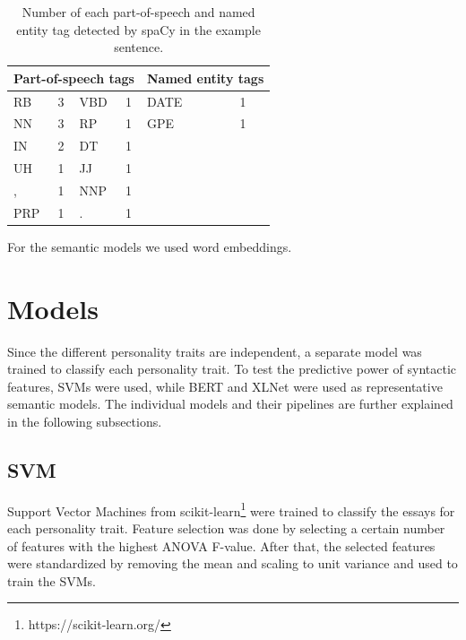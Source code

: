 \documentclass[10pt, a4paper]{article}
\begin{document}
\begin{table}[H]
	\centering
	\begin{tabular}{llllll}
		\hline
		\multicolumn{4}{l}{Part-of-speech tags} & \multicolumn{2}{l}{Named entity tags} \\ \hline
		RB        & 3       & VBD      & 1      & DATE                & 1               \\
		NN        & 3       & RP       & 1      & GPE                 & 1               \\ \cline{5-6} 
		IN        & 2       & DT       & 1      &                     &                 \\
		UH        & 1       & JJ       & 1      &                     &                 \\
		,         & 1       & NNP      & 1      &                     &                 \\
		PRP       & 1       & .        & 1      &                     &                 \\ \cline{1-4}
	\end{tabular}
	\caption{Number of each part-of-speech and named entity tag detected by spaCy in the example sentence.}
	\label{example features}
\end{table}

For the semantic models we used word embeddings.

\section{Models}

Since the different personality traits are independent, a separate model was trained to classify each personality trait.
To test the predictive power of syntactic features, SVMs were used, while BERT and XLNet were used as representative semantic models.
The individual models and their pipelines are further explained in the following subsections.

\subsection{SVM}

Support Vector Machines from scikit-learn\footnote{https://scikit-learn.org/} were trained to classify the essays for each personality trait.
Feature selection was done by selecting a certain number of features with the highest ANOVA F-value.
After that, the selected features were standardized by removing the mean and scaling to unit variance and used to train the SVMs.
\end{document}
